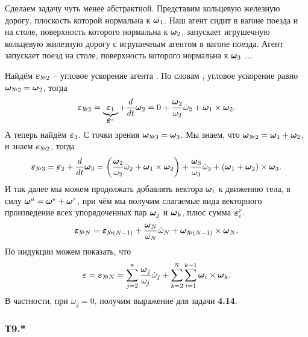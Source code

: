 Сделаем задачу чуть менее абстрактной. Представим кольцевую железную дорогу, плоскость которой нормальна к $\mbox{\boldmath $\omega$}_1$. Наш агент   сидит в вагоне поезда и на столе, поверхность которого нормальна к $\mbox{\boldmath $\omega$}_2$, запускает игрушечную кольцевую жилезную дорогу с игрушечным агентом   в вагоне поезда. Агент   запускает поезд на столе, поверхность которого нормальна к $\mbox{\boldmath $\omega$}_3$ ...

Найдём $\vc{\varepsilon}_{\text{\textnumero} 2}$ -- угловое ускорение агента . По словам , угловое ускорение равно $\vc{\omega}_{\text{\textnumero 2}} = \vc{\omega}_2$, тогда
$$
    \vc{\varepsilon}_{\text{\textnumero} 2} = \underbrace{\vc{\varepsilon}_1}_{\vc{\varepsilon}^e} + \frac{d}{dt} \vc{\omega}_2 = 0 + 
    \frac{\vc{\omega}_2}{\omega_2} \dot{\omega}_2
    + 
    \vc{\omega}_1 \times \vc{\omega}_2.
$$
А теперь найдём $\mbox{\boldmath $\varepsilon$}_3$. С точки зрения  $\vc{\omega}_{\text{\textnumero 3}} = \vc{\omega}_3$. Мы знаем, что $\vc{\omega}_{\text{\textnumero 2}} = \vc{\omega}_1 + \vc{\omega}_2$, и знаем $\vc{\varepsilon}_{\text{\textnumero} 2}$, тогда
$$
    \vc{\varepsilon}_{\text{\textnumero} 3} = \vc{\varepsilon}_2 + \frac{d}{dt} \vc{\omega}_3 = 
    \left(\frac{\vc{\omega}_2}{\omega_2} \dot{\omega}_2 + \vc{\omega}_1 \times \vc{\omega}_2\right)
    + 
    \frac{\vc{\omega}_3}{\omega_3} \dot{\omega}_3
    + 
    (\vc{\omega}_1 + \vc{\omega}_2) \times \vc{\omega}_3.
$$
И так далее мы можем продолжать добавлять вектора $\mbox{\boldmath $\omega$}_i$ к движению тела, в силу $\mbox{\boldmath $\omega$}^a = \mbox{\boldmath $\omega$}^e + \mbox{\boldmath $\omega$}^r$, при чём мы получим слагаемые вида векторного произведение всех упорядоченных пар $\mbox{\boldmath $\omega$}_j$ и $\mbox{\boldmath $\omega$}_k$, плюс сумма $\mbox{\boldmath $\varepsilon$}^r_i$.
$$
    \vc{\varepsilon}_{\text{\textnumero} N} = \vc{\varepsilon}_{\text{\textnumero} (N-1)} + 
    \frac{\vc{\omega}_N}{\omega_N} \dot{\omega}_N +
    \vc{\omega}_{\text{\textnumero} (N-1)} \times \vc{\omega}_N.
$$
По индукции можем показать, что
$$
    \vc{\varepsilon} = \vc{\varepsilon}_{\text{\textnumero} N} = \sum_{j=2}^n \frac{\vc{\omega}_j}{\omega_j} \dot{\omega}_j + \sum_{k=2}^N \sum_{i=1}^{k-1} \vc{\omega}_i \times \vc{\omega}_k.
$$
В частности, при $\dot{\omega}_j = 0$, получим выражение для задачи \textbf{4.14}.


\subsubsection*{Т9.*}


